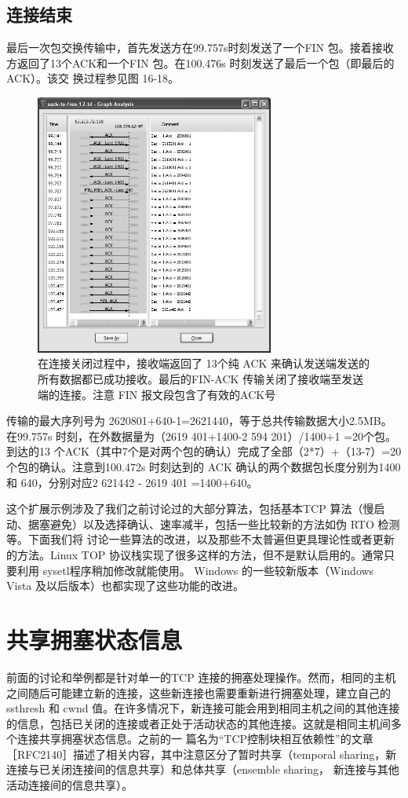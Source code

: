 \subsection{连接结束}
最后一次包交换传输中，首先发送方在99.757s时刻发送了一个FIN 包。接着接收方返回了13个ACK和一个FIN 包。在100.476s 时刻发送了最后一个包（即最后的ACK）。该交
换过程参见图 16-18。
\begin{figure}[!htb]
    \centering
	\includegraphics[width=0.7\textwidth]{imgs/16/16-18.png}
	\caption{在连接关闭过程中，接收端返回了 13个纯 ACK 来确认发送端发送的所有数据都已成功接收。最后的FIN-ACK 传输关闭了接收端至发送端的连接。注意 FIN 报文段包含了有效的ACK号}
\end{figure}

传输的最大序列号为 2620801+640-1=2621440，等于总共传输数据大小2.5MB。在99.757s 时刻，在外数据量为（2619 401+1400-2 594 201）/1400+1 =20个包。到达的13
个ACK（其中7个是对两个包的确认）完成了全部（2*7）+（13-7）=20个包的确认。注意到100.472s 时刻达到的 ACK 确认的两个数据包长度分别为1400和 640，分别对应2 621442 -
2619 401 =1400+640。

这个扩展示例涉及了我们之前讨论过的大部分算法，包括基本TCP 算法（慢启动、据塞避免）以及选择确认、速率减半，包括一些比较新的方法如伪 RTO 检测等。下面我们将
讨论一些算法的改进，以及那些不太普遍但更具理论性或者更新的方法。Linux TOP 协议栈实现了很多这样的方法，但不是默认启用的。通常只要利用 sysetl程序稍加修改就能使用。
Windows 的一些较新版本（Windows Vista 及以后版本）也都实现了这些功能的改进。

\section{共享拥塞状态信息}
前面的讨论和举例都是针对单一的TCP 连接的拥塞处理操作。然而，相同的主机之间随后可能建立新的连接，这些新连接也需要重新进行拥塞处理，建立自己的 ssthresh 和 cwnd
值。在许多情况下，新连接可能会用到相同主机之间的其他连接的信息，包括已关闭的连接或者正处于活动状态的其他连接。这就是相同主机间多个连接共享拥塞状态信息。之前的一
篇名为“TCP控制块相互依赖性”的文章［RFC2140］描述了相关内容，其中注意区分了暂时共享（temporal sharing，新连接与已关闭连接间的信息共享）和总体共享（ensemble sharing，
新连接与其他活动连接间的信息共享）。

